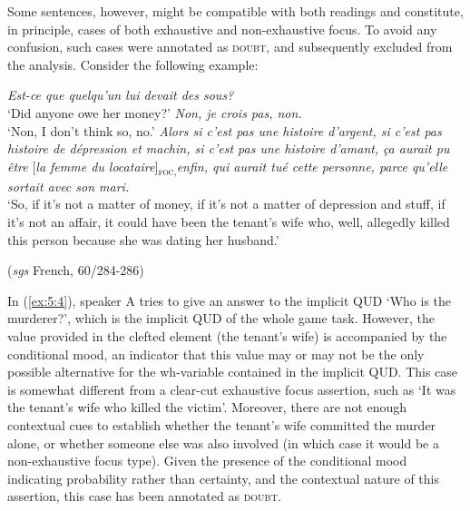 Some sentences, however, might be compatible with both readings and constitute, in principle, cases of both exhaustive and non-exhaustive focus. To avoid any confusion, such cases were annotated as \textsc{doubt}, and subsequently excluded from the analysis. Consider the following example: 

 \ea \label{ex:5:4}
\ea \textit{Est-ce que quelqu'un lui devait des sous?}\\
 `Did anyone owe her money?'
\ex \textit{Non, je crois pas, non.}\\    
`Non, I don't think so, no.'
 \textit{Alors  si c'est pas une histoire d'argent, si c'est pas histoire de  dépression et machin, si c'est pas une histoire d'amant}\textit{,} \textit{ça aurait pu être} {[\textit{la femme du locataire}]\textsubscript{\textsc{foc,}}}\normalsize \textit{enfin, qui aurait tué cette personne, parce qu'elle sortait avec son mari.}\\
`So, if it's not a matter of money, if it's not a matter of depression and stuff, if it's not an affair, it could have been the tenant's wife who, well, allegedly killed this person because she was dating her husband.' 

\hfill (\textit{sgs} French, 60/284-286)        
\z \z


In (\ref{ex:5:4}), speaker A tries to give an answer to the implicit QUD `Who is the murderer?', which is the implicit QUD of the whole game task. However, the value provided in the clefted element (the tenant's wife) is accompanied by the conditional mood, an indicator that this value may or may not be the only possible alternative for the wh-variable contained in the implicit QUD. This case is somewhat different from a clear-cut exhaustive focus assertion, such as `It was the tenant's wife who killed the victim'. Moreover, there are not enough contextual cues to establish whether the tenant's wife committed the murder alone, or whether someone else was also involved (in which case it would be a non-exhaustive focus type). Given the presence of the conditional mood indicating probability rather than certainty, and the contextual nature of this assertion, this case has been annotated as \textsc{doubt}.



